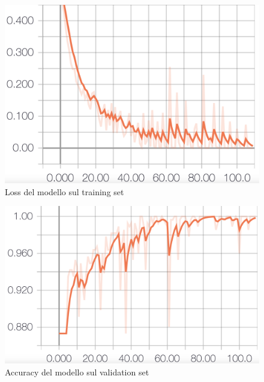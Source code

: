 \documentclass[8pt,notitlepage]{report}
\begin{document}
			\begin{figure}[H]
				\begin{center}
					\includegraphics[scale=.1865]{loss_Antonio}
					\caption{Loss del modello sul training set}
				\end{center}
			\end{figure}
			
			\begin{figure}[H]
				\begin{center}
					\includegraphics[scale=.1865]{val_acc_Antonio}
					\caption{Accuracy del modello sul validation set}
					\label{fig:acc_val_Antonio}
				\end{center}
			\end{figure}
			
\end{document}
